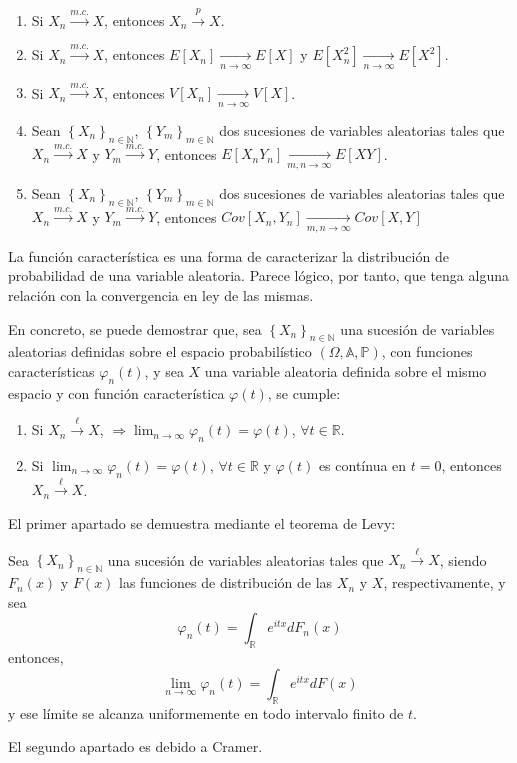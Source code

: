 \begin{enumerate}
\item Si $X_{n} \overset{m.c.}{\to} X $, entonces $X_{n} \overset{p}{\to} X $.
\item Si $X_{n} \overset{m.c.}{\to} X $, entonces $E[X_n]\underset{n\to\infty}{\to}E[X]$ y $E[X_n^2]\underset{n\to\infty}{\to}E[X^2]$.
\item Si $X_{n} \overset{m.c.}{\to} X $, entonces $V[X_n]\underset{n\to\infty}{\to}V[X]$.
\item Sean $ \left\{X_n\right\}_{n\in\mathbb{N}}$, $ \left\{Y_m\right\}_{m\in\mathbb{N}}$ dos sucesiones de variables aleatorias tales que $X_{n} \overset{m.c.}{\to} X $ y $Y_{m} \overset{m.c.}{\to} Y $, entonces $E[X_nY_n]\underset{m,n\to\infty}{\to}E[XY]$.
\item Sean $ \left\{X_n\right\}_{n\in\mathbb{N}}$, $ \left\{Y_m\right\}_{m\in\mathbb{N}}$ dos sucesiones de variables aleatorias tales que $X_{n} \overset{m.c.}{\to} X $ y $Y_{m} \overset{m.c.}{\to} Y $, entonces $Cov[X_n,Y_n]\underset{m,n\to\infty}{\to}Cov[X,Y]$

\end{enumerate}

La funci\'on caracter\'istica es una forma de caracterizar la distribuci\'on de probabilidad de una variable aleatoria. Parece l\'ogico, por tanto, que tenga alguna relaci\'on con la convergencia en ley de las mismas.

En concreto, se puede demostrar que, sea $ \left\{X_n\right\}_{n\in\mathbb{N}}$ una sucesi\'on de variables aleatorias definidas sobre el espacio probabil\'istico $\left(\Omega,\mathbb{A}, \mathbb{P}\right) $, con funciones caracter\'isticas $\varphi_n(t)$, y sea $X$ una variable aleatoria definida sobre el mismo espacio y con funci\'on caracter\'istica $\varphi(t)$, se cumple:
\begin{enumerate}
\item Si $X_{n} \overset{\ell}{\to} X $, $\Rightarrow \lim_{n\to\infty}\varphi_n(t)=\varphi(t)$, $\forall t\in\mathbb{R}$.
\item Si $\lim_{n\to\infty}\varphi_n(t)=\varphi(t)$, $\forall t\in\mathbb{R}$ y $\varphi(t)$ es cont\'inua en $t=0$, entonces $X_{n} \overset{\ell}{\to} X $.
\end{enumerate}
El primer apartado se demuestra mediante el teorema de Levy:
\begin{teorema}
Sea $ \left\{X_n\right\}_{n\in\mathbb{N}}$ una sucesi\'on de variables aleatorias tales que $X_{n} \overset{\ell}{\to} X $, siendo $F_n(x)$ y $F(x)$ las funciones de distribuci\'on de las $X_n$ y $X$, respectivamente, y sea 
\begin{equation}
\varphi_n(t)=\int_{\mathbb{R}}e^{itx}dF_n(x)
\end{equation}
entonces,
\begin{equation}
\lim_{n\to\infty}\varphi_n(t)=\int_{\mathbb{R}}e^{itx}dF(x)
\end{equation}
y ese l\'imite se alcanza uniformemente en todo intervalo finito de $t$.

\end{teorema}
El segundo apartado es debido a Cramer. 

